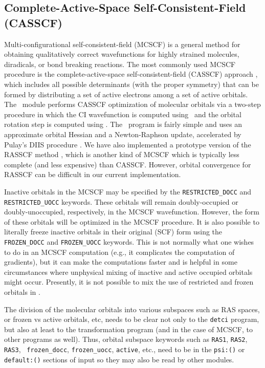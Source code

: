 \subsection{Complete-Active-Space Self-Consistent-Field (CASSCF)}
\label{sec:casscf}

Multi-configurational self-consistent-field (MCSCF) 
is a general method for obtaining qualitatively correct
wavefunctions for highly strained molecules, diradicals, or bond
breaking reactions.  The most commonly used MCSCF procedure
is the complete-active-space self-consistent-field (CASSCF)
approach \cite{Roos:1980}, which includes all possible determinants
(with the proper symmetry) that can be formed by distributing 
a set of active electrons among a set of active orbitals.
The \PSIdetcasman\ module performs
CASSCF optimization of molecular orbitals via a two-step
procedure in which the CI wavefunction is computed using
\PSIdetci\, and the orbital rotation step is computed using
\PSIdetcas.  The \PSIdetcas\ program is fairly simple
and uses an approximate orbital Hessian \cite{Chaban:1997:88} 
and a Newton-Raphson update,
accelerated by Pulay's DIIS procedure \cite{Pulay:1980}.  
We have also implemented a prototype version of the RASSCF method
\cite{Malmqvist:1990:RASSCF}, which is another kind of MCSCF which 
is typically less complete (and less expensive) than CASSCF.
However, orbital convergence for RASSCF can be difficult in our
current implementation.

Inactive orbitals in the MCSCF may be specified by the 
{\tt RESTRICTED\_DOCC} and {\tt RESTRICTED\_UOCC} keywords.  These
orbitals will remain doubly-occupied or doubly-unoccupied, respectively,
in the MCSCF wavefunction.  However, the form of these orbitals will
be optimized in the MCSCF procedure.  It is also possible to 
literally freeze inactive orbitals in their original (SCF) form
using the {\tt FROZEN\_DOCC} and {\tt FROZEN\_UOCC} keywords.
This is not normally what one wishes to do in an MCSCF computation
(e.g., it complicates the computation of gradients),
but it can make the computations faster and is helpful in some
circumstances where unphysical mixing of inactive and active
occupied orbitals might occur.  Presently, it is not possible
to mix the use of restricted and frozen orbitals in \PSIthree.

The division of the molecular orbitals into various subspaces such as RAS
spaces, or frozen vs active orbitals, etc, needs to be clear not only to
the {\tt detci} program, but also at least to the transformation program
(and in the case of MCSCF, to other programs as well).  Thus,
orbital subspace keywords such as {\tt RAS1}, {\tt RAS2}, {\tt RAS3}, {\tt
frozen\_docc}, {\tt frozen\_uocc}, {\tt active}, etc., need to be
in the {\tt psi:()} or {\tt default:()} sections of input so they may
also be read by other modules.

